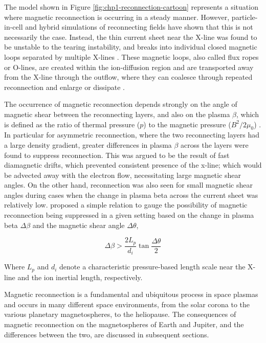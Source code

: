 The model shown in Figure \ref{fig:chp1-reconnection-cartoon} represents a situation where magnetic reconnection is occurring in a steady manner. However, particle-in-cell and hybrid simulations of reconnecting fields have shown that this is not necessarily the case. Instead, the thin current sheet near the X-line was found to be unstable to the tearing instability, and breaks into individual closed magnetic loops separated by multiple X-lines \cite{Drake2006ElectronReconnection,Drake2006FormationReconnection}. These magnetic loops, also called flux ropes or O-lines, are created within the ion-diffusion region and are transported away from the X-line through the outflow, where they can coalesce through repeated reconnection and enlarge or dissipate \cite{Markidis2012CollisionlessChain,Wang2016CoalescenceReconnection}. 

The occurrence of magnetic reconnection depends strongly on the angle of magnetic shear between the reconnecting layers, and also on the plasma $\beta$, which is defined as the ratio of thermal pressure ($p$) to the magnetic pressure ($B^2/2\mu_0$) \cite{Swisdak2003DiamagneticMagnetopause,Swisdak2010TheHeliosphere,Phan2010TheObservations}. In particular for asymmetric reconnection, where the two reconnecting layers had a large density gradient, greater differences in plasma $\beta$ across the layers were found to suppress reconnection. This was argued to be the result of fast diamagnetic drifts, which prevented consistent presence of the x-line; which would be advected away with the electron flow, necessitating large magnetic shear angles. On the other hand, reconnection was also seen for small magnetic shear angles during cases when the change in plasma beta across the current sheet was relatively low.  proposed a simple relation to gauge the possibility of magnetic reconnection being suppressed in a given setting based on the change in plasma beta $\Delta \beta$ and the magnetic shear angle $\Delta \theta$,

\begin{equation}
    \Delta \beta > \frac{2 L_p}{d_i} \tan\frac{\Delta\theta}{2}
\end{equation}

Where $L_p$ and $d_i$ denote a characteristic pressure-based length scale near the X-line and the ion inertial length, respectively. 

Magnetic reconnection is a fundamental and ubiquitous process in space plasmas and occurs in many different space environments, from the solar corona to the various planetary magnetospheres, to the heliopause. The consequences of magnetic reconnection on the magnetospheres of Earth and Jupiter, and the differences between the two, are discussed in subsequent sections.


